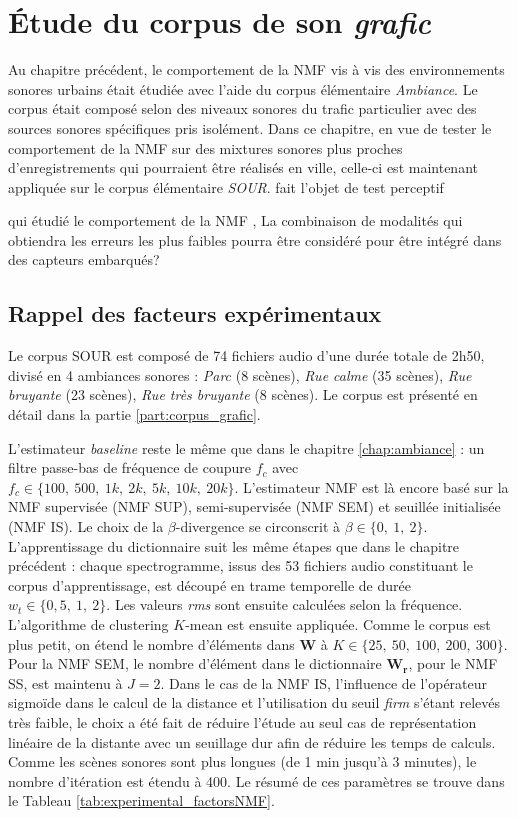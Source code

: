 
\chapter{\'Etude du corpus de son \textit{grafic}}
\label{chap:grafic}
Au chapitre précédent, le comportement de la NMF vis à vis des environnements sonores urbains était étudiée avec l'aide du corpus élémentaire \textit{Ambiance}. Le corpus était composé selon des niveaux sonores du trafic particulier avec des sources sonores spécifiques pris isolément. Dans ce chapitre, en vue de tester le comportement de la NMF sur des mixtures sonores plus proches d'enregistrements qui pourraient être réalisés en ville, celle-ci est maintenant appliquée sur le corpus élémentaire \textit{SOUR}.  
fait l'objet de test perceptif

qui étudié le comportement de la NMF , La combinaison de modalités qui obtiendra les erreurs les plus faibles pourra être considéré pour être intégré dans des capteurs embarqués?

\section{Rappel des facteurs expérimentaux}

Le corpus SOUR est composé de 74 fichiers audio d'une durée totale de 2h50, divisé en 4 ambiances sonores : \textit{Parc} (8 scènes), \textit{Rue calme} (35 scènes), \textit{Rue bruyante} (23 scènes), \textit{Rue très bruyante} (8 scènes). Le corpus est présenté en détail dans la partie \ref{part:corpus_grafic}.

L'estimateur \textit{baseline} reste le même que dans le chapitre \ref{chap:ambiance} : un filtre passe-bas de fréquence de coupure $f_c$ avec $f_c \in \lbrace 100,~500,~1k,~2k,~5k,~10k,~20k \rbrace$.
L'estimateur NMF est là encore basé sur la NMF supervisée (NMF SUP), semi-supervisée (NMF SEM) et seuillée initialisée (NMF IS). Le choix de la $\beta$-divergence se circonscrit à $\beta \in \lbrace 0,~1,~2 \rbrace$.
L'apprentissage du dictionnaire suit les même étapes que dans le chapitre précédent : chaque spectrogramme, issus des 53 fichiers audio constituant le corpus d'apprentissage, est découpé en trame temporelle de durée $w_t \in \lbrace 0,5,~1,~2 \rbrace$. Les valeurs \textit{rms} sont ensuite calculées selon la fréquence. L'algorithme de clustering $K$-mean est ensuite appliquée. Comme le corpus est plus petit, on étend le nombre d'éléments dans $\mathbf{W}$ à $K \in \lbrace 25,~50,~100,~200,~ 300 \rbrace$.
Pour la NMF SEM, le nombre d'élément dans le dictionnaire $\mathbf{W_r}$, pour le NMF SS, est maintenu à $J = 2$.
Dans le cas de la NMF IS, l'influence de l'opérateur sigmoïde dans le calcul de la distance et l'utilisation du seuil \textit{firm} s'étant relevés très faible, le choix a été fait de réduire l'étude au seul cas de représentation linéaire de la distante avec un seuillage dur afin de réduire les temps de calculs.
Comme les scènes sonores sont plus longues (de 1 min jusqu'à 3 minutes), le nombre d'itération est étendu à 400. 
Le résumé de ces paramètres se trouve dans le Tableau \ref{tab:experimental_factorsNMF}.
 

